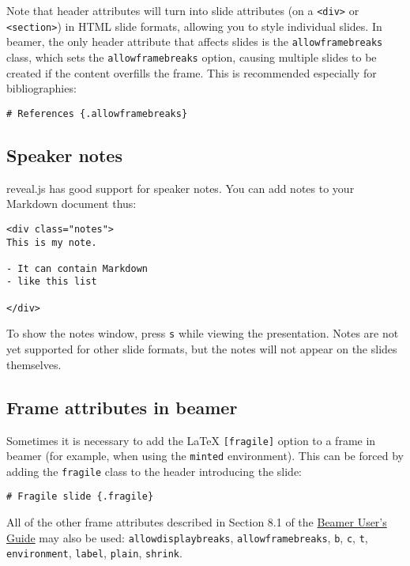 \documentclass[]{article}
\begin{document}
Note that header attributes will turn into slide attributes (on a
\texttt{\textless{}div\textgreater{}} or
\texttt{\textless{}section\textgreater{}}) in HTML slide formats,
allowing you to style individual slides. In beamer, the only header
attribute that affects slides is the \texttt{allowframebreaks} class,
which sets the \texttt{allowframebreaks} option, causing multiple slides
to be created if the content overfills the frame. This is recommended
especially for bibliographies:

\begin{verbatim}
# References {.allowframebreaks}
\end{verbatim}

\subsection{Speaker notes}\label{speaker-notes}

reveal.js has good support for speaker notes. You can add notes to your
Markdown document thus:

\begin{verbatim}
<div class="notes">
This is my note.

- It can contain Markdown
- like this list

</div>
\end{verbatim}

To show the notes window, press \texttt{s} while viewing the
presentation. Notes are not yet supported for other slide formats, but
the notes will not appear on the slides themselves.

\subsection{Frame attributes in
beamer}\label{frame-attributes-in-beamer}

Sometimes it is necessary to add the LaTeX \texttt{{[}fragile{]}} option
to a frame in beamer (for example, when using the \texttt{minted}
environment). This can be forced by adding the \texttt{fragile} class to
the header introducing the slide:

\begin{verbatim}
# Fragile slide {.fragile}
\end{verbatim}

All of the other frame attributes described in Section 8.1 of the
\href{http://ctan.math.utah.edu/ctan/tex-archive/macros/latex/contrib/beamer/doc/beameruserguide.pdf}{Beamer
User's Guide} may also be used: \texttt{allowdisplaybreaks},
\texttt{allowframebreaks}, \texttt{b}, \texttt{c}, \texttt{t},
\texttt{environment}, \texttt{label}, \texttt{plain}, \texttt{shrink}.
\end{document}
